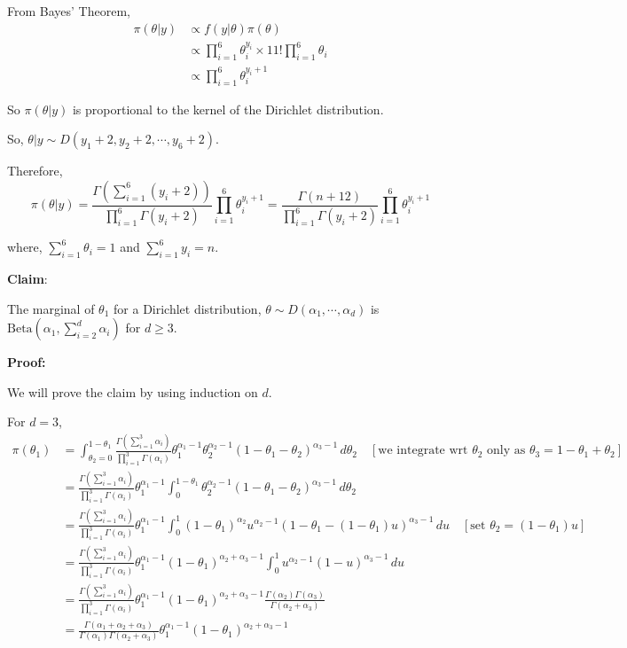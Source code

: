 \documentclass[a4paper]{article}
\begin{document}
From Bayes' Theorem,
\begin{align*}
    \pi(\theta|y) &\propto f(y|\theta) \pi(\theta)\\
    &\propto \prod_{i=1}^{6} \theta_i^{y_i} \times 11! \prod_{i=1}^{6} \theta_i\\
    &\propto \prod_{i=1}^{6} \theta_i^{y_i + 1}
\end{align*}

So \(\pi(\theta|y)\) is proportional to the kernel of the Dirichlet distribution. 

\noindent So, \(\theta|y \sim D(y_1+2,y_2+2, \cdots, y_6+2)\).

Therefore,
\[
    \pi(\theta|y) = \frac{\Gamma\left(\sum_{i=1}^{6} (y_i + 2)\right)}{\prod_{i=1}^{6} \Gamma(y_i +2)} \prod_{i=1}^{6} \theta_i^{y_i + 1}
    = \frac{\Gamma\left(n+12\right)}{\prod_{i=1}^{6} \Gamma(y_i +2)} \prod_{i=1}^{6} \theta_i^{y_i + 1}
\]

where, \(\sum_{i=1}^{6} \theta_i = 1\) and \(\sum_{i=1}^{6} y_i = n\).

\noindent \textbf{Claim}: 

The marginal of \(\theta_1\) for a Dirichlet distribution, \(\theta \sim D(\alpha_1,\cdots,\alpha_d)\) is \(\text{Beta}\left(\alpha_1,\sum_{i=2}^{d} \alpha_i\right)\) for \(d \geq 3\).

\noindent \textbf{Proof:}

We will prove the claim by using induction on \(d\).

For \(d = 3\),
\begin{align*}
    \pi(\theta_1) &= \int_{\theta_2 = 0}^{1-\theta_1} \frac{\Gamma(\sum_{i=1}^{3} \alpha_i)}{\prod_{i=1}^{3} \Gamma(\alpha_i)} \theta_1^{\alpha_1-1}\theta_2^{\alpha_2-1} (1 - \theta_1 - \theta_2)^{\alpha_3-1} \, d\theta_2\quad[\text{we integrate wrt \(\theta_2\) only as \(\theta_3 = 1 -\theta_1+\theta_2\)}]\\
    &= \frac{\Gamma(\sum_{i=1}^{3} \alpha_i)}{\prod_{i=1}^{3} \Gamma(\alpha_i)}\theta_1^{\alpha_1-1} \int_{0}^{1-\theta_1} \theta_2^{\alpha_2-1} (1- \theta_1 - \theta_2)^{\alpha_3-1} \, d\theta_2\\
    &=\frac{\Gamma(\sum_{i=1}^{3} \alpha_i)}{\prod_{i=1}^{3} \Gamma(\alpha_i)}\theta_1^{\alpha_1-1} \int_{0}^{1}  (1-\theta_1)^{\alpha_2} u^{\alpha_2 - 1}\left(1 - \theta_1 - (1-\theta_1) u\right)^{\alpha_3-1} \,du  \quad [\text{set }\theta_2 = (1 - \theta_1)u]\\
    &=\frac{\Gamma(\sum_{i=1}^{3} \alpha_i)}{\prod_{i=1}^{3} \Gamma(\alpha_i)}\theta_1^{\alpha_1-1}(1-\theta_1)^{\alpha_2+\alpha_3-1} \int_{0}^{1}   u^{\alpha_2 - 1}(1 - u)^{\alpha_3-1} \,du\\
    &= \frac{\Gamma(\sum_{i=1}^{3} \alpha_i)}{\prod_{i=1}^{3} \Gamma(\alpha_i)}\theta_1^{\alpha_1-1}(1-\theta_1)^{\alpha_2+\alpha_3-1} \frac{\Gamma(\alpha_2)\Gamma(\alpha_3)}{\Gamma(\alpha_2 + \alpha_3)}\\
    &= \frac{\Gamma(\alpha_1 + \alpha_2 + \alpha_3)}{\Gamma(\alpha_1)\Gamma(\alpha_2 + \alpha_3)}\theta_1^{\alpha_1-1}(1-\theta_1)^{\alpha_2+\alpha_3-1} 
\end{align*}
\end{document}

